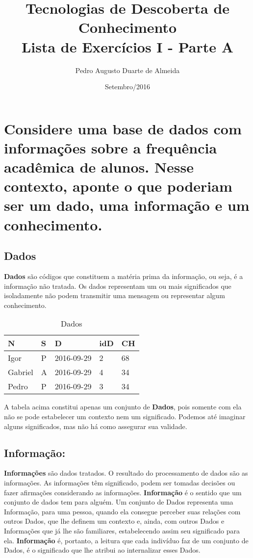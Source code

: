 \documentclass{article}
\title{Tecnologias de Descoberta de Conhecimento\\
Lista de Exercícios I - Parte A}
\author{Pedro Augusto Duarte de Almeida}
\date{Setembro/2016}
\begin{document}
\maketitle

\section{Considere uma base de dados com informações sobre a frequência acadêmica de alunos. Nesse contexto, aponte o que poderiam ser um dado, uma informação e um conhecimento.}

\subsection{Dados}
\textbf{Dados} são códigos que constituem a matéria prima da informação, ou seja, é a informação não tratada. Os dados representam um ou mais significados que isoladamente não podem transmitir uma mensagem ou representar algum conhecimento.

\begin{table}[h]
\centering
\caption{Dados}
\label{dados}
\begin{tabular}{|l|l|l|l|l|}
\hline
N       & S & D          & idD & CH \\ \hline
Igor    & P & 2016-09-29 & 2   & 68 \\ \hline
Gabriel & A & 2016-09-29 & 4   & 34 \\ \hline
Pedro   & P & 2016-09-29 & 3   & 34 \\ \hline
\end{tabular}
\end{table}

\noindent
A tabela acima constitui apenas um conjunto de \textbf{Dados}, pois somente com ela não se pode estabelecer um contexto nem um significado. Podemos até imaginar alguns significados, mas não há como assegurar sua validade.
\noindent
\subsection{Informação:}
\textbf{Informações} são dados tratados. O resultado do processamento de dados são as informações. As informações têm significado, podem ser tomadas decisões ou fazer afirmações considerando as informações. 
\noindent
\textbf{Informação} é o sentido que um conjunto de dados tem para alguém. Um conjunto de Dados representa uma Informação, para uma pessoa, quando ela consegue perceber suas relações com outros Dados, que lhe definem um contexto e, ainda, com outros Dados e Informações que já lhe são familiares, estabelecendo  assim seu significado  para  ela. 
\singlespacing
\noindent
\textbf{Informação} é, portanto, a leitura que cada indivíduo faz de um conjunto de Dados, é o significado que lhe atribui ao internalizar esses Dados. 
\end{document}

